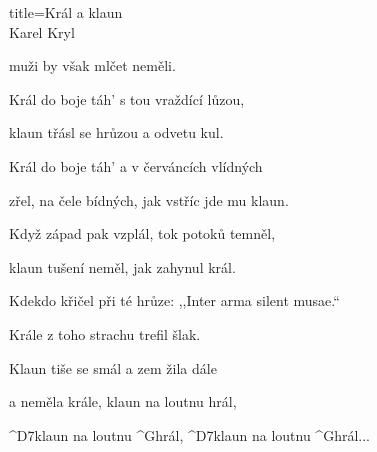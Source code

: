 \begin{song}{title=\centering Král a klaun \\\normalsize Karel Kryl  \vspace*{-0.3cm}}
{	muži by však mlčet neměli.

	Král do boje táh' s tou vraždící lůzou,

	klaun třásl se hrůzou a odvetu kul.

\sloka
	Král do boje táh' a v červáncích vlídných

	zřel, na čele bídných, jak vstříc jde mu klaun.

	Když západ pak vzplál, tok potoků temněl,

	klaun tušení neměl, jak zahynul král.

	Kdekdo křičel při té hrůze: ,,Inter arma silent musae.``

	Krále z toho strachu trefil šlak.

	Klaun tiše se smál a zem žila dále
	
	a neměla krále, klaun na loutnu hrál,

	^{D7}klaun na loutnu ^{G}hrál, ^{D7}klaun na loutnu ^{G}hrál\elipsa.\elipsa.\elipsa.



}
\setcounter{Slokočet}{0}
\end{song}
